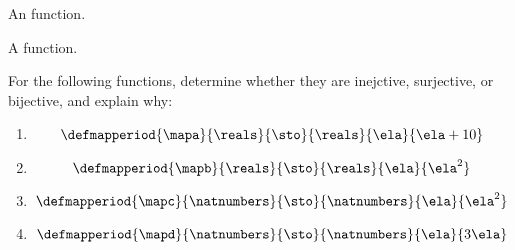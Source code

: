 \begin{marginfigure}
    \centering
    \caption{An  function.}
    \label{fig:inj-function}
\end{marginfigure}

\begin{marginfigure}
    \centering
    \caption{A  function.}
    \label{fig:surj-function}
\end{marginfigure}

\begin{exercise}
    For the following functions, determine whether they are inejctive, surjective, or bijective, and explain why:
    \begin{enumerate}
        \item
              \begin{equation*}
                  \defmapperiod{\mapa}{\reals}{\sto}{\reals}{\ela}{\ela + 10}
              \end{equation*}
        \item
              \begin{equation*}
                  \defmapperiod{\mapb}{\reals}{\sto}{\reals}{\ela}{\ela^2}
              \end{equation*}
        \item
              \begin{equation*}
                  \defmapperiod{\mapc}{\natnumbers}{\sto}{\natnumbers}{\ela}{\ela^2}
              \end{equation*}
        \item
              \begin{equation*}
                  \defmapperiod{\mapd}{\natnumbers}{\sto}{\natnumbers}{\ela}{3\ela}
              \end{equation*}
    \end{enumerate}
\end{exercise}

